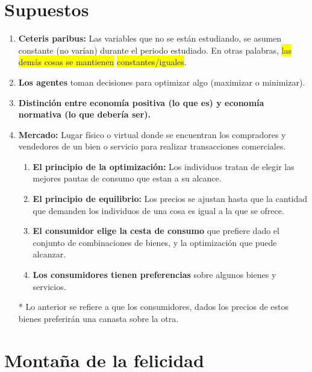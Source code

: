 \documentclass{templateNote}
\begin{document}
\section{Supuestos}
\begin{enumerate}
    \item \textbf{Ceteris paribus:} Las variables que no se están estudiando, se
    asumen constante (no varían) durante el periodo estudiado. En otras palabras, \colorbox{yellow}{las demás cosas se mantienen} 
    \colorbox{yellow}{constantes/iguales}.

    \item \textbf{Los agentes} toman decisiones para optimizar algo (maximizar o
    minimizar).

    \item \textbf{Distinción entre economía positiva (lo que es) y economía
    normativa (lo que debería ser).}

    \item \textbf{Mercado:} Lugar físico o virtual donde se encuentran los compradores y vendedores de un bien o servicio para realizar transacciones comerciales.\\ 
    \begin{enumerate}
        \item \textbf{El principio de la optimización:} Los individuos tratan de elegir las
        mejores pautas de consumo que estan a su alcance.

        \item \textbf{El principio de equilibrio:} Los precios se ajustan hasta que la
        cantidad que demanden los individuos de una cosa es igual a la
        que se ofrece.

        \item \textbf{El consumidor elige la cesta de consumo} que prefiere dado el
        conjunto de combinaciones de bienes, y la optimización que
        puede alcanzar.

        \item \textbf{Los consumidores tienen preferencias} sobre algunos bienes y servicios.
        
    \end{enumerate}
* Lo anterior se refiere a que los consumidores, dados los precios
de estos bienes preferirán una canasta sobre la otra.
\end{enumerate}

\section{Montaña de la felicidad}
\indent
\end{document}
